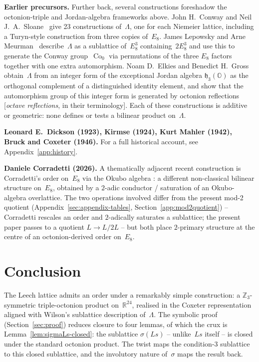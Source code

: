 \documentclass[twoside,english]{paper}
\numberwithin{equation}{section}
\numberwithin{figure}{section}
\theoremstyle{definition}
\theoremstyle{remark}
\newcommand{\OO}{\mathbb{O}}          %
\newcommand{\RR}{\mathbb{R}}
\newcommand{\ZZ}{\mathbb{Z}}
\newcommand{\LL}{\Lambda}             %
\DeclareMathOperator{\Co}{Co}
\begin{document}
\textbf{Earlier precursors.}  Further back, several constructions
foreshadow the octonion-triple and Jordan-algebra frameworks above.
John H.~Conway and Neil J.~A.~Sloane~\cite{ConwaySloane1982} give 23
constructions of~$\LL$, one for each Niemeier lattice, including a
Turyn-style construction from three copies of~$E_8$.  James Lepowsky
and Arne Meurman~\cite{LepowskyMeurman1982} describe~$\LL$ as a
sublattice of~$E_8^3$ containing~$2 E_8^3$ and use this to generate
the Conway group~$\Co_0$ via permutations of the three $E_8$ factors
together with one extra automorphism.  Noam D.~Elkies and
Benedict H.~Gross~\cite{ElkiesGross1996}
obtain~$\LL$ from an integer form of the exceptional Jordan algebra
$\mathfrak{h}_3(\OO)$ as the orthogonal complement of a distinguished
identity element, and show that the automorphism group of this
integer form is generated by octonion reflections [\emph{octave
reflections}, in their terminology].  Each of these
constructions is additive or geometric: none defines or tests a
bilinear product on~$\LL$.

\textbf{Leonard E.~Dickson (1923), Kirmse (1924), Kurt Mahler (1942),
Bruck and Coxeter (1946).}  For a full historical account, see
Appendix~\ref{app:history}.

\textbf{Daniele Corradetti (2026).}  A thematically adjacent recent
construction is Corradetti's order on~$E_8$ via the Okubo algebra
\cite{Corradetti2026}: a different non-classical bilinear structure
on~$E_8$, obtained by a $2$-adic conductor / saturation of an
Okubo-algebra overlattice.  The two operations involved differ from
the present mod-2 quotient (Appendix~\ref{sec:appendix-tables},
Section~\ref{app:mod2quotient}) -- Corradetti rescales an order and
$2$-adically saturates a sublattice; the present paper passes to a
quotient $L \to L/2L$ -- but both place $2$-primary structure at
the centre of an octonion-derived order on~$E_8$.

\section{Conclusion}\label{sec:conclusion}

The Leech lattice admits an order under a remarkably simple
construction: a $\ZZ_3$-symmetric triple-octonion product on~$\RR^{24}$,
realised in the Coxeter representation aligned with Wilson's
sublattice description of~$\LL$.  The symbolic proof
(Section~\ref{sec:proof}) reduces closure to four lemmas, of which
the crux is Lemma~\ref{lem:sigmaLs-closed}: the sublattice $\sigma(Ls)$ -- unlike~$Ls$
itself -- is closed under the standard octonion product.  The twist
maps the condition-3 sublattice to this closed sublattice, and the
involutory nature of~$\sigma$ maps the result back.
\end{document}
